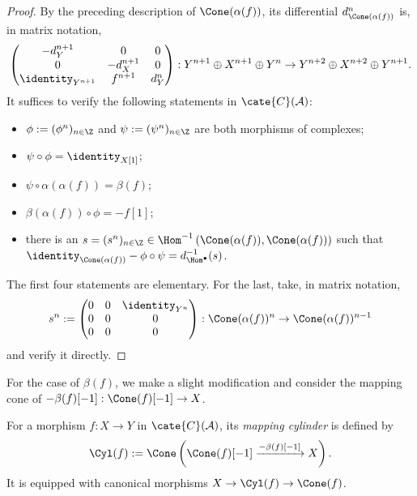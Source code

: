 \begin{proof}
	By the preceding description of $\Cone(\alpha(f))$, its differential
	$d_{\Cone(\alpha(f))}^n$ is, in matrix notation,
	\[ \begin{pmatrix} -d_Y^{n+1} & 0 & 0 \\ 0 & -d_X^{n+1} & 0 \\ \identity_{Y^{n+1}} & f^{n+1} & d_Y^n \end{pmatrix} : Y^{n+1} \oplus X^{n+1} \oplus Y^n \to Y^{n+2} \oplus X^{n+2} \oplus Y^{n+1}. \]
	It suffices to verify the following statements in
	$\cate{C}(\mathcal{A})$:
	\begin{itemize}
		\item $\phi:=(\phi^n)_{n\in\Z}$ and $\psi:=(\psi^n)_{n\in\Z}$ are
		both morphisms of complexes;
		\item $\psi\circ\phi=\identity_{X[1]}$;
		\item $\psi\circ\alpha(\alpha(f))=\beta(f)$;
		\item $\beta(\alpha(f))\circ\phi=-f[1]$;
		\item there is an
		$s=(s^n)_{n\in\Z}\in\Hom^{-1}\left(\Cone(\alpha(f)),
		\Cone(\alpha(f))\right)$ such that
		$\identity_{\Cone(\alpha(f))}-\phi\circ\psi
		=d^{-1}_{\Hom^\bullet}(s)$.
	\end{itemize}
	The first four statements are elementary. For the last, take, in matrix
	notation,
	\[ s^n := \begin{pmatrix} 0 & 0 & \identity_{Y^n} \\ 0 & 0 & 0 \\ 0 & 0 & 0 \end{pmatrix}: \Cone(\alpha(f))^n \to \Cone(\alpha(f))^{n-1} \]
	and verify it directly.
\end{proof}

For the case of $\beta(f)$, we make a slight modification and consider the
mapping cone of $-\beta(f)[-1]:\Cone(f)[-1]\to X$.

\begin{definition}\label{def:Cyl}
	For a morphism $f:X\to Y$ in $\cate{C}(\mathcal{A})$, its
	\emph{mapping cylinder} is defined by
	\[ \Cyl(f) := \Cone\left( \Cone(f)[-1] \xrightarrow{-\beta(f)[-1]} X \right). \]
	It is equipped with canonical morphisms $X\to\Cyl(f)\to\Cone(f)$.
\end{definition}

